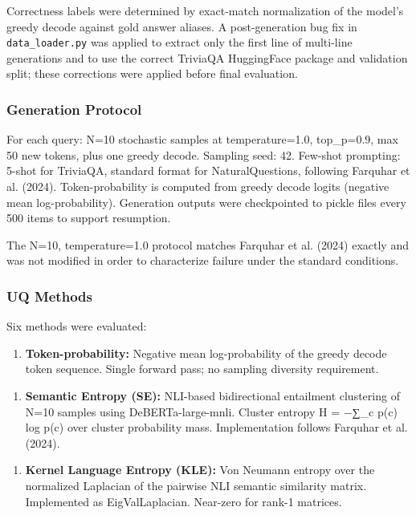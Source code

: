 Correctness labels were determined by exact-match normalization of the model's greedy decode against gold answer aliases. A post-generation bug fix in \texttt{data_loader.py} was applied to extract only the first line of multi-line generations and to use the correct TriviaQA HuggingFace package and validation split; these corrections were applied before final evaluation.

\subsubsection{Generation Protocol}

For each query: N=10 stochastic samples at temperature=1.0, top_p=0.9, max 50 new tokens, plus one greedy decode. Sampling seed: 42. Few-shot prompting: 5-shot for TriviaQA, standard format for NaturalQuestions, following Farquhar et al. (2024). Token-probability is computed from greedy decode logits (negative mean log-probability). Generation outputs were checkpointed to pickle files every 500 items to support resumption.

The N=10, temperature=1.0 protocol matches Farquhar et al. (2024) exactly and was not modified in order to characterize failure under the standard conditions.

\subsubsection{UQ Methods}

Six methods were evaluated:

\begin{enumerate}
\item \textbf{Token-probability:} Negative mean log-probability of the greedy decode token sequence. Single forward pass; no sampling diversity requirement.
\end{enumerate}

\begin{enumerate}
\item \textbf{Semantic Entropy (SE):} NLI-based bidirectional entailment clustering of N=10 samples using DeBERTa-large-mnli. Cluster entropy H = −∑_c p(c) log p(c) over cluster probability mass. Implementation follows Farquhar et al. (2024).
\end{enumerate}

\begin{enumerate}
\item \textbf{Kernel Language Entropy (KLE):} Von Neumann entropy over the normalized Laplacian of the pairwise NLI semantic similarity matrix. Implemented as EigValLaplacian. Near-zero for rank-1 matrices.
\end{enumerate}

